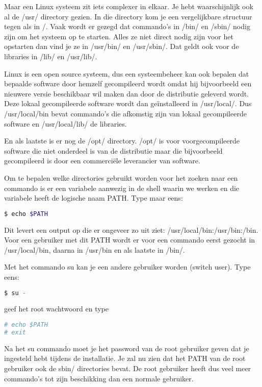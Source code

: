 Maar een Linux systeem zit iets complexer in elkaar. Je hebt waarschijnlijk ook al de /usr/
directory gezien. In die directory kom je een vergelijkbare structuur tegen als in /. Vaak wordt er gezegd dat
commando's in /bin/ en /sbin/ nodig zijn om het systeem op te starten. Alles ze niet direct nodig zijn voor het
opstarten dan vind je ze in /usr/bin/ en /usr/sbin/. Dat geldt ook voor de libraries in /lib/ en /usr/lib/.

Linux is een open source systeem, dus een systeembeheer kan ook bepalen dat bepaalde software
door hemzelf gecompileerd wordt omdat hij bijvoorbeeld een nieuwere versie beschikbaar wil maken dan door de
distributie geleverd wordt. Deze lokaal gecompileerde software wordt dan ge\"installeerd in /usr/local/. Dus
/usr/local/bin bevat commando's die afkomstig zijn van lokaal gecompileerde software en /usr/local/lib/ de libraries.

En als laatste is er nog de /opt/ directory. /opt/ is voor voorgecompileerde software die niet onderdeel is van de
distributie maar die bijvoorbeeld gecompileerd is door een commerci\"ele leverancier van software.

Om te bepalen welke directories gebruikt worden voor het zoeken naar een commando is er een variabele aanwezig in de
shell waarin we werken en die variabele heeft de logische naam PATH. Type maar eens:
\begin{lstlisting}[language=bash]
$ echo $PATH
\end{lstlisting}
Dit levert een output op die er ongeveer zo uit ziet: /usr/local/bin:/usr/bin:/bin. Voor een gebruiker met dit PATH
wordt er voor een commando eerst gezocht in /usr/local/bin, daarna in /usr/bin en als laatste in /bin/.

Met het commando su kan je een andere gebruiker worden (switch user). Type eens:
\begin{lstlisting}[language=bash]
$ su -
\end{lstlisting}
geef het root wachtwoord en type
\begin{lstlisting}[language=bash]
# echo $PATH
# exit
\end{lstlisting}
Na het su commando moet je het password van de root gebruiker geven dat je ingesteld hebt tijdens
de installatie. Je zal nu zien dat het PATH van de root gebruiker ook de sbin/ directories bevat. De root gebruiker
heeft dus veel meer commando's tot zijn beschikking dan een normale gebruiker.
